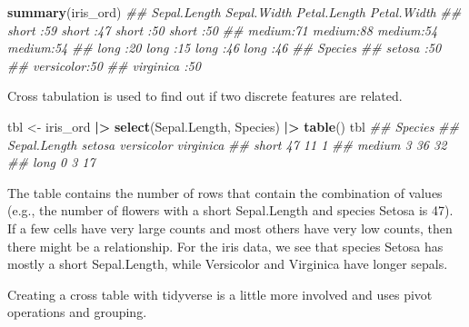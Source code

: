 \documentclass[
  notitlepage]{book}
\newenvironment{Shaded}{\begin{snugshade}}{\end{snugshade}}
\newcommand{\CommentTok}[1]{\textcolor[rgb]{0.56,0.35,0.01}{\textit{#1}}}
\newcommand{\ErrorTok}[1]{\textcolor[rgb]{0.64,0.00,0.00}{\textbf{#1}}}
\newcommand{\KeywordTok}[1]{\textcolor[rgb]{0.13,0.29,0.53}{\textbf{#1}}}
\newcommand{\NormalTok}[1]{#1}
\newcommand{\OperatorTok}[1]{\textcolor[rgb]{0.81,0.36,0.00}{\textbf{#1}}}
\newcommand{\StringTok}[1]{\textcolor[rgb]{0.31,0.60,0.02}{#1}}
\begin{document}
\begin{Shaded}
\begin{Highlighting}[]
\KeywordTok{summary}\NormalTok{(iris\_ord)}
\CommentTok{\#\#  Sepal.Length Sepal.Width Petal.Length Petal.Width}
\CommentTok{\#\#  short :59    short :47   short :50    short :50  }
\CommentTok{\#\#  medium:71    medium:88   medium:54    medium:54  }
\CommentTok{\#\#  long  :20    long  :15   long  :46    long  :46  }
\CommentTok{\#\#        Species  }
\CommentTok{\#\#  setosa    :50  }
\CommentTok{\#\#  versicolor:50  }
\CommentTok{\#\#  virginica :50}
\end{Highlighting}
\end{Shaded}

Cross tabulation is used to find out if two discrete features are
related.

\begin{Shaded}
\begin{Highlighting}[]
\NormalTok{tbl \textless{}{-}}\StringTok{ }\NormalTok{iris\_ord }\OperatorTok{|}\ErrorTok{\textgreater{}}\StringTok{ }
\StringTok{  }\KeywordTok{select}\NormalTok{(Sepal.Length, Species) }\OperatorTok{|}\ErrorTok{\textgreater{}}\StringTok{ }
\StringTok{  }\KeywordTok{table}\NormalTok{()}
\NormalTok{tbl}
\CommentTok{\#\#             Species}
\CommentTok{\#\# Sepal.Length setosa versicolor virginica}
\CommentTok{\#\#       short      47         11         1}
\CommentTok{\#\#       medium      3         36        32}
\CommentTok{\#\#       long        0          3        17}
\end{Highlighting}
\end{Shaded}

The table contains the number of rows that contain the combination of
values (e.g., the number of flowers with a short Sepal.Length and
species Setosa is 47). If a few cells have very large counts
and most others have very low counts, then there might be a
relationship. For the iris data, we see that species Setosa has mostly a
short Sepal.Length, while Versicolor and Virginica have longer sepals.

Creating a cross table with tidyverse is a little more involved and uses
pivot operations and grouping.
\end{document}
